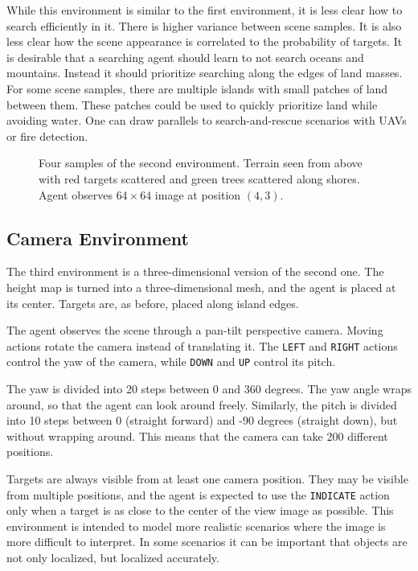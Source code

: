 While this environment is similar to the first environment, it is less clear how to search efficiently in it.
There is higher variance between scene samples.
It is also less clear how the scene appearance is correlated to the probability of targets.
It is desirable that a searching agent should learn to not search oceans and mountains.
Instead it should prioritize searching along the edges of land masses.
For some scene samples, there are multiple islands with small patches of land between them.
These patches could be used to quickly prioritize land while avoiding water.
One can draw parallels to search-and-rescue scenarios with UAVs or fire detection.

\begin{figure}
    \centering
    
    \caption[Terrain environment]{Four samples of the second environment. Terrain seen from above with red targets scattered and green trees scattered along shores. Agent observes \(64 \times 64\) image at position \((4, 3)\).}
    \label{fig:terrain}
\end{figure}

\subsection{Camera Environment}

The third environment is a three-dimensional version of the second one.
The height map is turned into a three-dimensional mesh, and the agent is placed at its center.
Targets are, as before, placed along island edges.

The agent observes the scene through a pan-tilt perspective camera.
Moving actions rotate the camera instead of translating it.
The \texttt{LEFT} and \texttt{RIGHT} actions control the yaw of the camera, while \texttt{DOWN} and \texttt{UP} control its pitch.

The yaw is divided into 20 steps between 0 and 360 degrees.
The yaw angle wraps around, so that the agent can look around freely.
Similarly, the pitch is divided into 10 steps between 0 (straight forward) and -90 degrees (straight down), but without wrapping around.
This means that the camera can take 200 different positions.

Targets are always visible from at least one camera position.
They may be visible from multiple positions, and the agent is expected to use the \texttt{INDICATE} action only when a target is as close to the center of the view image as possible.
This environment is intended to model more realistic scenarios where the image is more difficult to interpret.
In some scenarios it can be important that objects are not only localized, but localized accurately.

